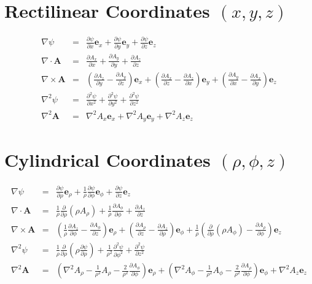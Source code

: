 \section{Rectilinear Coordinates $(x, y, z)$}
\begin{eqnarray}
\nabla \psi & = & \frac{\partial \psi}{\partial x} \mathbf{e}_x + \frac{\partial \psi}{\partial y} \mathbf{e}_y + \frac{\partial \psi}{\partial z} \mathbf{e}_z \\
\nabla \cdot \mathbf{A} & = & \frac{\partial A_x}{\partial x} + \frac{\partial A_y}{\partial y} + \frac{\partial A_z}{\partial z} \\
\nabla \times \mathbf{A} & = & \left( \frac{\partial A_z}{\partial y} - \frac{\partial A_y}{\partial z} \right) \mathbf{e}_x + \left( \frac{\partial A_x}{\partial z} - \frac{\partial A_z}{\partial x} \right) \mathbf{e}_y + \left( \frac{\partial A_y}{\partial x} - \frac{\partial A_x}{\partial y} \right) \mathbf{e}_z \\
\nabla^2 \psi & = & \frac{\partial^2 \psi}{\partial x^2} + \frac{\partial^2 \psi}{\partial y^2} + \frac{\partial^2 \psi}{\partial z^2} \\
\nabla^2 \mathbf{A} & = & \nabla^2 A_x \mathbf{e}_x + \nabla^2 A_y \mathbf{e}_y + \nabla^2 A_z \mathbf{e}_z
\end{eqnarray}


\section{Cylindrical Coordinates $(\rho, \phi, z)$}
\begin{eqnarray}
\nabla \psi & = & \frac{\partial \psi}{\partial \rho} \mathbf{e}_\rho + \frac{1}{\rho} \frac{\partial \psi}{\partial \phi} \mathbf{e}_\phi + \frac{\partial \psi}{\partial z} \mathbf{e}_z \\
\nabla \cdot \mathbf{A} & = & \frac{1}{\rho} \frac{\partial}{\partial \rho} \left( \rho A_\rho \right) + \frac{1}{\rho} \frac{\partial A_\phi}{\partial \phi} + \frac{\partial A_z}{\partial z} \\
\nabla \times \mathbf{A} & = & \left( \frac{1}{\rho} \frac{\partial A_z}{\partial \phi} - \frac{\partial A_\phi}{\partial z} \right) \mathbf{e}_\rho + \left( \frac{\partial A_\rho}{\partial z} - \frac{\partial A_z}{\partial \rho} \right) \mathbf{e}_\phi + \frac{1}{\rho} \left( \frac{\partial}{\partial \rho} \left( \rho A_\phi \right) - \frac{\partial A_\rho}{\partial \phi} \right) \mathbf{e}_z \\
\nabla^2 \psi & = & \frac{1}{\rho} \frac{\partial}{\partial \rho} \left( \rho \frac{\partial \psi}{\partial \rho} \right) + \frac{1}{\rho^2} \frac{\partial^2 \psi}{\partial \phi^2} + \frac{\partial^2 \psi}{\partial z^2} \\
\nabla^2 \mathbf{A} & = & \left( \nabla^2 A_\rho - \frac{1}{\rho^2} A_\rho - \frac{2}{\rho^2} \frac{\partial A_\phi}{\partial \phi} \right) \mathbf{e}_\rho + \left( \nabla^2 A_\phi - \frac{1}{\rho^2} A_\phi - \frac{2}{\rho^2} \frac{\partial A_\rho}{\partial \phi} \right) \mathbf{e}_\phi + \nabla^2 A_z \mathbf{e}_z
\end{eqnarray}


